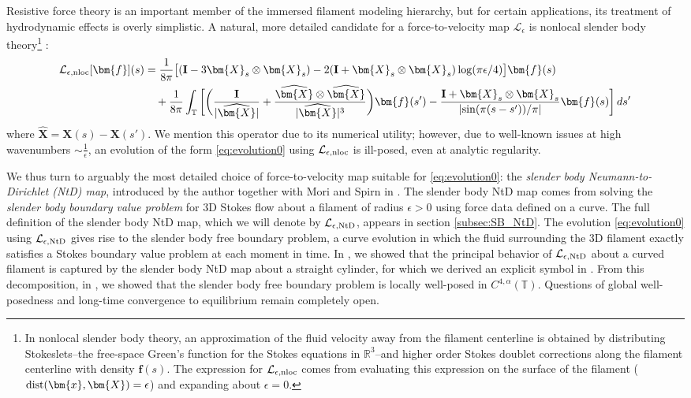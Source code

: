 \documentclass[11pt,reqno]{amsart}
\newcommand{\R}{\mathbb{R}}
\newcommand{\T}{\mathbb{T}}
\newcommand{\bx}{\bm{x}}
\newcommand{\X}{\bm{X}}
\newcommand{\abs}[1]{\left\lvert #1 \right\rvert}
\newcommand{\wh}[1]{\widehat{#1}}
\newcommand{\mc}[1]{\mathcal{#1}}
\numberwithin{equation}{section}
\theoremstyle{definition}
\begin{document}
Resistive force theory is an important member of the immersed filament modeling hierarchy, but for certain applications, its treatment of hydrodynamic effects is overly simplistic. A natural, more detailed candidate for a force-to-velocity map $\mc{L}_\epsilon$ is nonlocal slender body theory\footnote{In nonlocal slender body theory, an approximation of the fluid velocity away from the filament centerline is obtained by distributing Stokeslets--the free-space Green's function for the Stokes equations in $\R^3$--and higher order Stokes doublet corrections along the filament centerline with density $\bm{f}(s)$. The expression for $\mc{L}_{\epsilon,\rm nloc}$ comes from evaluating this expression on the surface of the filament (${\rm dist}(\bx,\X)=\epsilon$) and expanding about $\epsilon=0$. } \cite{keller1976slender,johnson1980improved,tornberg2004simulating}:
\begin{equation}
\begin{aligned}
  \mc{L}_{\epsilon,\rm nloc}[\bm{f}](s) &= \frac{1}{8\pi}\big[({\bf I}-3\X_s\otimes\X_s)-2({\bf I}+\X_s\otimes\X_s)\log(\pi\epsilon/4) \big]\bm{f}(s)\\
  &\quad +\frac{1}{8\pi}\int_\T\bigg[\bigg(\frac{{\bf I}}{|\wh{\X}|}+ \frac{\wh{\X}\otimes\wh{\X}}{|\wh{\X}|^3}\bigg)\bm{f}(s')- \frac{{\bf I}+\X_s\otimes\X_s}{\abs{\sin(\pi(s-s'))/\pi}}\bm{f}(s)\bigg]\,ds'
\end{aligned}
\end{equation}
where $\wh{\X} = \X(s)-\X(s')$. We mention this operator due to its numerical utility; however, due to well-known issues \cite{gotz2000interactions,tornberg2004simulating,shelley2000stokesian,inverse} at high wavenumbers $\sim \frac{1}{\epsilon}$, an evolution of the form \eqref{eq:evolution0} using $\mc{L}_{\epsilon,\rm nloc}$ is ill-posed, even at analytic regularity.


We thus turn to arguably the most detailed choice of force-to-velocity map suitable for \eqref{eq:evolution0}: the \emph{slender body Neumann-to-Dirichlet (NtD) map}, introduced by the author together with Mori and Spirn in \cite{closed_loop,free_ends}. The slender body NtD map comes from solving the \emph{slender body boundary value problem} for 3D Stokes flow about a filament of radius $\epsilon>0$ using force data defined on a curve. The full definition of the slender body NtD map, which we will denote by $\mc{L}_{\epsilon,\rm NtD}$, appears in section \ref{subsec:SB_NtD}. The evolution \eqref{eq:evolution0} using $\mc{L}_{\epsilon,\rm NtD}$ gives rise to the slender body free boundary problem, a curve evolution in which the fluid surrounding the 3D filament exactly satisfies a Stokes boundary value problem at each moment in time. In \cite{ohm2025angle,ohm2024free}, we showed that the principal behavior of $\mc{L}_{\epsilon,\rm NtD}$ about a curved filament is captured by the slender body NtD map about a straight cylinder, for which we derived an explicit symbol in \cite{inverse}. From this decomposition, in \cite{ohm2025slender}, we showed that the slender body free boundary problem is locally well-posed in $C^{4,\alpha}(\T)$. Questions of global well-posedness and long-time convergence to equilibrium remain completely open. 
\end{document}
